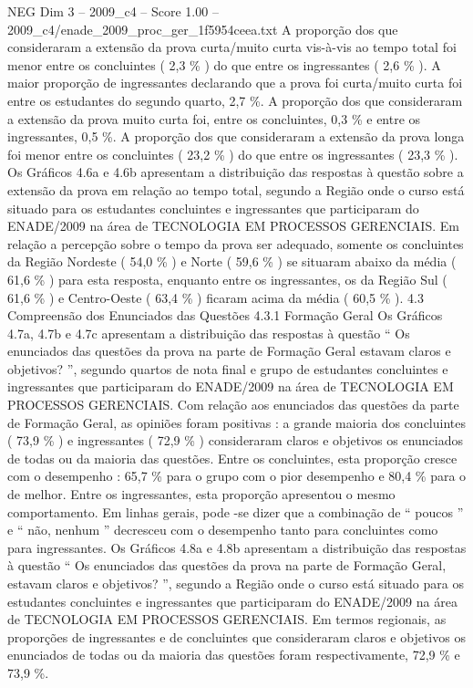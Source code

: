 \begin{textsample}{NEG Dim 3 – 2009\_c4 – Score 1.00 – 2009\_c4/enade\_2009\_proc\_ger\_1f5954ceea.txt}
A proporção dos que consideraram a extensão da prova curta/muito curta vis-à-vis ao tempo total foi menor entre os concluintes ( 2,3 \% ) do que entre os ingressantes ( 2,6 \% ).
A maior proporção de ingressantes declarando que a prova foi curta/muito curta foi entre os estudantes do segundo quarto, 2,7 \%.
A proporção dos que consideraram a extensão da prova muito curta foi, entre os concluintes, 0,3 \% e entre os ingressantes, 0,5 \%.
A proporção dos que consideraram a extensão da prova longa foi menor entre os concluintes ( 23,2 \% ) do que entre os ingressantes ( 23,3 \% ).
Os Gráficos 4.6a e 4.6b apresentam a distribuição das respostas à questão sobre a extensão da prova em relação ao tempo total, segundo a Região onde o curso está situado para os estudantes concluintes e ingressantes que participaram do ENADE/2009 na área de TECNOLOGIA EM PROCESSOS GERENCIAIS.
Em relação a percepção sobre o tempo da prova ser adequado, somente os concluintes da Região Nordeste ( 54,0 \% ) e Norte ( 59,6 \% ) se situaram abaixo da média ( 61,6 \% ) para esta resposta, enquanto entre os ingressantes, os da Região Sul ( 61,6 \% ) e Centro-Oeste ( 63,4 \% ) ficaram acima da média ( 60,5 \% ). 4.3 Compreensão dos Enunciados das Questões 4.3.1 Formação Geral Os Gráficos 4.7a, 4.7b e 4.7c apresentam a distribuição das respostas à questão “ Os enunciados das questões da prova na parte de Formação Geral estavam claros e objetivos? ”, segundo quartos de nota final e grupo de estudantes concluintes e ingressantes que participaram do ENADE/2009 na área de TECNOLOGIA EM PROCESSOS GERENCIAIS.
Com relação aos enunciados das questões da parte de Formação Geral, as opiniões foram positivas : a grande maioria dos concluintes ( 73,9 \% ) e ingressantes ( 72,9 \% ) consideraram claros e objetivos os enunciados de todas ou da maioria das questões.
Entre os concluintes, esta proporção cresce com o desempenho : 65,7 \% para o grupo com o pior desempenho e 80,4 \% para o de melhor.
Entre os ingressantes, esta proporção apresentou o mesmo comportamento.
Em linhas gerais, pode -se dizer que a combinação de “ poucos ” e “ não, nenhum ” decresceu com o desempenho tanto para concluintes como para ingressantes.
Os Gráficos 4.8a e 4.8b apresentam a distribuição das respostas à questão “ Os enunciados das questões da prova na parte de Formação Geral, estavam claros e objetivos? ”, segundo a Região onde o curso está situado para os estudantes concluintes e ingressantes que participaram do ENADE/2009 na área de TECNOLOGIA EM PROCESSOS GERENCIAIS.
Em termos regionais, as proporções de ingressantes e de concluintes que consideraram claros e objetivos os enunciados de todas ou da maioria das questões foram respectivamente, 72,9 \% e 73,9 \%.

\end{textsample}
